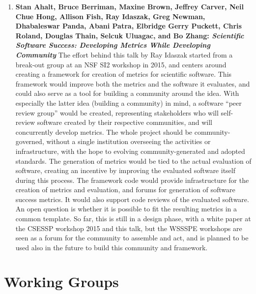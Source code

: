 \documentclass[11pt, oneside]{amsart}
\newcommand{\todo}[1]{{\color{blue}$\blacksquare$~\textsf{[TODO: #1]}}}
\begin{document}
\begin{enumerate}
\item \textbf{Stan Ahalt, Bruce Berriman, Maxine Brown, Jeffrey Carver, Neil
Chue Hong, Allison Fish, Ray Idaszak, Greg Newman, Dhabaleswar Panda, Abani
Patra, Elbridge Gerry Puckett, Chris Roland, Douglas Thain, Selcuk Uluagac, and
Bo Zhang: \textit{Scientific Software Success: Developing Metrics While
Developing Community}} The effort behind this talk by Ray Idaszak started from a
break-out group at an NSF SI2 workshop in 2015, and centers around creating a
framework for creation of metrics for scientific software. This framework would
improve both the metrics and the software it evaluates, and could also serve as
a tool for building a community around the idea. With especially the latter idea
(building a community) in mind, a software ``peer review group'' would be
created, representing stakeholders who will self-review software created by
their respective communities, and will concurrently develop metrics. The whole
project should be community-governed, without a single institution overseeing
the activities or infrastructure, with the hope to evolving community-generated
and adopted standards. The generation of metrics would be tied to the actual
evaluation of software, creating an incentive by improving the evaluated
software itself during this process. The framework code would provide
infrastructure for the creation of metrics and evaluation, and forums for
generation of software success metrics. It would also support code reviews of
the evaluated software. An open question is whether it is possible to fit the
resulting metrics in a common template. So far, this is still in a design phase,
with a white paper at the CSESSP workshop 2015 and this talk, but the WSSSPE
workshops are seen as a forum for the community to assemble and act, and is
planned to be used also in the future to build this community and framework.

\end{enumerate}

\section{Working Groups} \label{sec:WGs}

\end{document}
